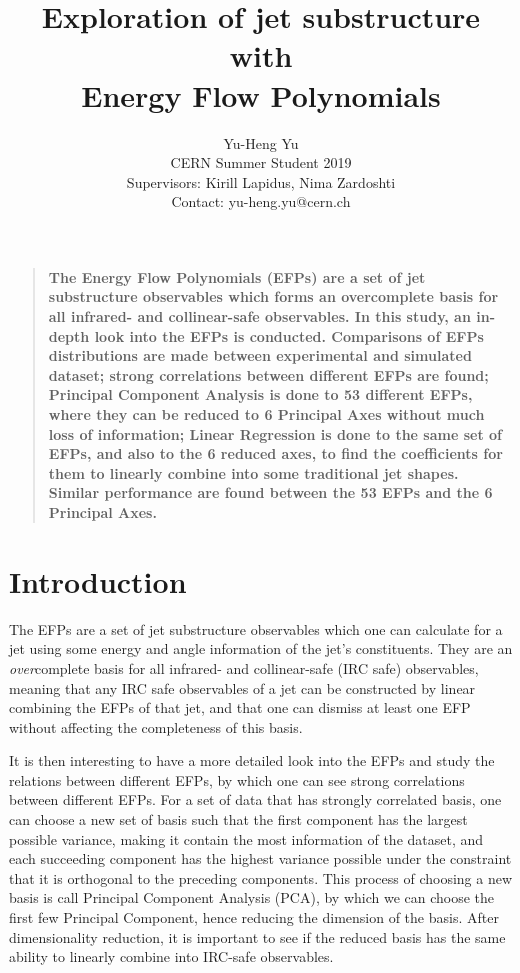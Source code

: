 \documentclass[12pt]{article}
\title{Exploration of jet substructure with \\ Energy Flow Polynomials}
\author{Yu-Heng Yu\\
\normalsize{CERN Summer Student 2019}\\
\normalsize{Supervisors: Kirill Lapidus, Nima Zardoshti}\\
\normalsize{Contact: yu-heng.yu@cern.ch}\\
}
\date{}
\newenvironment{sciabstract}{%
\begin{quote} \bf}
{\end{quote}}
\begin{document}
\maketitle

\begin{sciabstract}
The Energy Flow Polynomials (EFPs) are a set of jet substructure observables \cite{EFP} which forms an overcomplete basis for all infrared- and collinear-safe observables. In this study, an in-depth look into the EFPs is conducted. Comparisons of EFPs distributions are made between experimental and simulated dataset; strong correlations between different EFPs are found; Principal Component Analysis is done to 53 different EFPs, where they can be reduced to 6 Principal Axes without much loss of information; Linear Regression is done to the same set of EFPs, and also to the 6 reduced axes, to find the coefficients for them to linearly combine into some traditional jet shapes. Similar performance are found between the 53 EFPs and the 6 Principal Axes.
\end{sciabstract}
\section{Introduction}
The EFPs are a set of jet substructure observables \cite{EFP} which one can calculate for a jet using some energy and angle information of the jet's constituents. They are an \emph{over}complete basis for all infrared- and collinear-safe (IRC safe) observables, meaning that any IRC safe observables of a jet can be constructed by linear combining the EFPs of that jet, and that one can dismiss at least one EFP without affecting the completeness of this basis.

It is then interesting to have a more detailed look into the EFPs and study the relations between different EFPs, by which one can see strong correlations between different EFPs. For a set of data that has strongly correlated basis, one can choose a new set of basis such that the first component has the largest possible variance, making it contain the most information of the dataset, and each succeeding component has the highest variance possible under the constraint that it is orthogonal to the preceding components. This process of choosing a new basis is call Principal Component Analysis (PCA), by which we can choose the first few Principal Component, hence reducing the dimension of the basis. After dimensionality reduction, it is important to see if the reduced basis has the same ability to linearly combine into IRC-safe observables.
\end{document}

